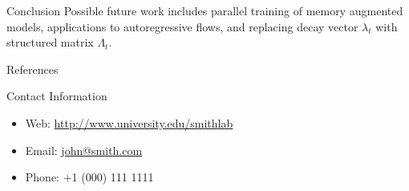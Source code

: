 \documentclass[final]{beamer}
\newlength{\onecolwid}
\begin{document}
\begin{frame}[t]
\begin{columns}[t]
\begin{column}{\onecolwid}
\begin{block}{Conclusion}
\vspace{1ex}
Possible future work includes parallel training of memory augmented models, applications
to autoregressive flows, and replacing decay vector $\lambda_t$ with structured matrix
$\Lambda_t$.


\end{block}



\begin{block}{References}

\nocite{*} %
\small{
\vspace{0.75in}}

\end{block}





\begin{alertblock}{Contact Information}

\begin{itemize}
\item Web: \href{http://www.university.edu/smithlab}{http://www.university.edu/smithlab}
\item Email: \href{mailto:john@smith.com}{john@smith.com}
\item Phone: +1 (000) 111 1111
\end{itemize}

\end{alertblock}


\end{column} %

\end{columns} %

\end{frame} %
\end{document}
